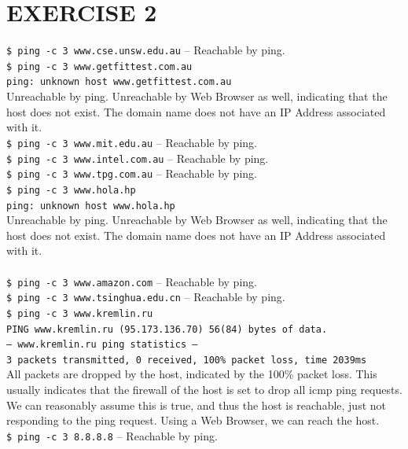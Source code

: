 \documentclass[a4paper,11pt]{article}
\newcommand{\code}{\texttt}
\begin{document}
\section{EXERCISE 2}
\code{\$ ping -c 3 www.cse.unsw.edu.au} -- Reachable by ping.\\
\newline
\code{\$ ping -c 3 www.getfittest.com.au}\\
\code{ping: unknown host www.getfittest.com.au}\\
Unreachable by ping. Unreachable by Web Browser as well, indicating that the host does not exist. The domain name does not have an IP Address associated with it.\\
\newline
\code{\$ ping -c 3 www.mit.edu.au} -- Reachable by ping.\\
\newline
\code{\$ ping -c 3 www.intel.com.au} -- Reachable by ping.\\
\newline
\code{\$ ping -c 3 www.tpg.com.au} -- Reachable by ping.\\
\newline
\code{\$ ping -c 3 www.hola.hp}\\
\code{ping: unknown host www.hola.hp}\\
Unreachable by ping. Unreachable by Web Browser as well, indicating that the host does not exist. The domain name does not have an IP Address associated with it.\\
\pagebreak\\
\code{\$ ping -c 3 www.amazon.com} -- Reachable by ping.\\
\newline
\code{\$ ping -c 3 www.tsinghua.edu.cn} -- Reachable by ping.\\
\newline
\code{\$ ping -c 3 www.kremlin.ru}\\
\code{PING www.kremlin.ru (95.173.136.70) 56(84) bytes of data.}\\
\code{--- www.kremlin.ru ping statistics ---}\\
\code{3 packets transmitted, 0 received, 100\% packet loss, time 2039ms}\\
All packets are dropped by the host, indicated by the 100\% packet loss. This usually indicates that the firewall of the host is set to drop all icmp ping requests. We can reasonably assume this is true, and thus the host is reachable, just not responding to the ping request. Using a Web Browser, we can reach the host.\\
\newline
\code{\$ ping -c 3 8.8.8.8} -- Reachable by ping.\\
\end{document}
